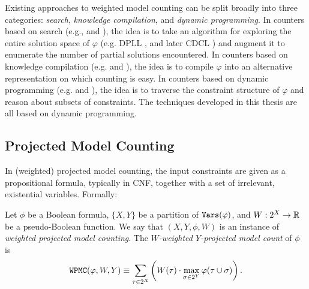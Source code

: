 
Existing approaches to weighted model counting can be split broadly into three categories: \emph{search}, \emph{knowledge compilation}, and \emph{dynamic programming}. In counters based on search (e.g.,   \cite{SBK05} and  \cite{Thurley2006}), the idea is to take an algorithm for exploring the entire solution space of $\varphi$ (e.g. DPLL \cite{davis1960computing,davis1962machine}, and later CDCL \cite{biere2009conflict}) and augment it to enumerate the number of partial solutions encountered. In counters based on knowledge compilation (e.g.  \cite{OD15} and  \cite{LM17}), the idea is to compile $\varphi$ into an alternative representation on which counting is easy. In counters based on dynamic programming (e.g.  \cite{DPV20} and  \cite{FHWZ18,FHZ19}), the idea is to traverse the constraint structure of $\varphi$ and reason about subsets of constraints. 
The techniques developed in this thesis are all based on dynamic programming.

\subsection{Projected Model Counting}
In (weighted) projected model counting, the input constraints are given as a propositional formula, typically in CNF, together with a set of irrelevant, existential variables.
Formally:
\begin{definition}
	Let $\phi$ be a Boolean formula, $\{X, Y\}$ be a partition of $\texttt{\upshape Vars}(\varphi)$, and $W: 2^X \to \mathbb{R}$ be a pseudo-Boolean function. We say that $(X, Y, \phi, W)$ is an instance of \emph{weighted projected model counting}.
	The \emph{$W$-weighted $Y$-projected model count} of $\phi$ is
	$$\texttt{\upshape WPMC}(\varphi, W, Y) \equiv \sum_{\tau \in 2^X} \left(  W(\tau) \cdot \max_{\sigma \in 2^Y} \varphi(\tau \cup \sigma)  \right).$$
\end{definition}

